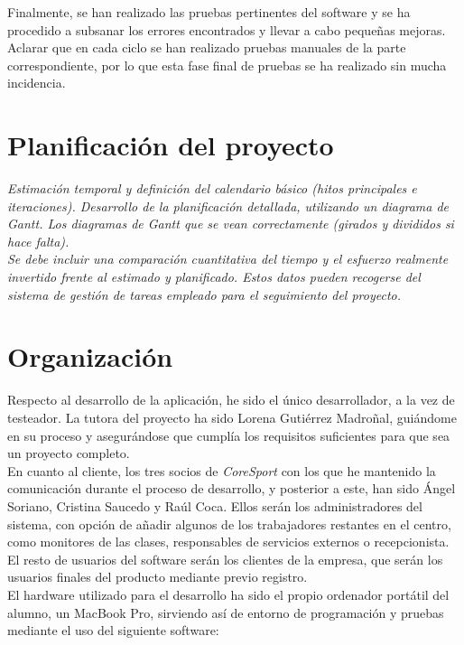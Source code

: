 Finalmente, se han realizado las pruebas pertinentes del software y se ha procedido a subsanar los errores encontrados y llevar a cabo pequeñas mejoras. Aclarar que en cada ciclo se han realizado pruebas manuales de la parte correspondiente, por lo que esta fase final de pruebas se ha realizado sin mucha incidencia.


\section{Planificación del proyecto}

\textit{Estimación temporal y definición del calendario básico (hitos principales e iteraciones). Desarrollo de la planificación detallada, utilizando un diagrama de Gantt. Los diagramas de Gantt que se vean correctamente (girados y divididos si hace falta).}\\

\textit{Se debe incluir una comparación cuantitativa del tiempo y el esfuerzo realmente invertido frente al estimado y planificado. Estos datos pueden recogerse del sistema de gestión de tareas empleado para el seguimiento del proyecto.}


\section{Organización}

Respecto al desarrollo de la aplicación, he sido el único desarrollador, a la vez de testeador. La tutora del proyecto ha sido Lorena Gutiérrez Madroñal, guiándome en su proceso y asegurándose que cumplía los requisitos suficientes para que sea un proyecto completo. 
\\

En cuanto al cliente, los tres socios de \textsl{CoreSport} con los que he mantenido la comunicación durante el proceso de desarrollo, y posterior a este, han sido Ángel Soriano, Cristina Saucedo y Raúl Coca. Ellos serán los administradores del sistema, con opción de añadir algunos de los trabajadores restantes en el centro, como monitores de las clases, responsables de servicios externos o recepcionista. 
\\

El resto de usuarios del software serán los clientes de la empresa, que serán los usuarios finales del producto mediante previo registro.
\\

El hardware utilizado para el desarrollo ha sido el propio ordenador portátil del alumno, un MacBook Pro, sirviendo así de entorno de programación y pruebas mediante el uso del siguiente software: 

